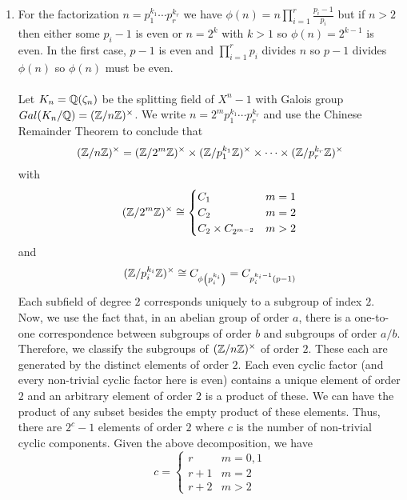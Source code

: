 \documentclass[12pt]{extarticle}
\begin{document}
\begin{enumerate}
\begin{enumerate}
\item For the factorization $n = p_1^{k_1} \cdots p_r^{k_r}$ we have $\phi(n) = n \prod\limits_{i = 1}^{r} \frac{p_i - 1}{p_i}$ but if $n > 2$ then either some $p_i-1$ is even or $n = 2^k$ with $k > 1$ so $\phi(n) = 2^{k - 1}$ is even. In the first case, $p - 1$ is even and $\prod\limits_{i = 1}^r p_i$ divides $n$ so $p-1$ divides $\phi(n)$ so $\phi(n)$ must be even. \\ \\

Let $K_n = \mathbb{Q}(\zeta_n)$ be the splitting field of $X^n - 1$ with Galois group $Gal \small(K_n / \mathbb{Q} \small) = (\mathbb{Z}/n\mathbb{Z})^\times$. We write $n = 2^m p_1^{k_1} \cdots p_r^{k_r}$ and use the Chinese Remainder Theorem to conclude that \[ (\mathbb{Z}/n\mathbb{Z})^\times = (\mathbb{Z}/ 2^m \mathbb{Z})^\times \times (\mathbb{Z}/ p_1^{k_1} \mathbb{Z})^\times \times \cdots \times (\mathbb{Z}/ p_r^{k_r} \mathbb{Z})^\times\]
with \[ (\mathbb{Z}/ 2^m \mathbb{Z})^\times \cong 
\begin{cases}
C_1 & m = 1 \\
C_2 & m = 2 \\
C_2 \times C_{2^{m-2}} & m > 2
\end{cases} \] 
and \[(\mathbb{Z}/ p_i^{k_i} \mathbb{Z})^\times \cong C_{\phi \left(p_i^{k_i} \right)} = C_{p_i^{k_i - 1} ( p -1)}\]
Each subfield of degree $2$ corresponds uniquely to a subgroup of index $2$. Now, we use the fact that, in an abelian group of order $a$, there is a one-to-one correspondence between subgroups of order $b$ and subgroups of order $a/b$. Therefore, we classify the subgroups of $(\mathbb{Z}/ n \mathbb{Z})^\times$ of order $2$. These each are generated by the distinct elements of order $2$. Each even cyclic factor (and every non-trivial cyclic factor here is even) contains a unique element of order $2$ and an arbitrary element of order $2$ is a product of these. We can have the product of any subset besides the empty product of these elements. Thus, there are $2^{c} - 1$ elements of order $2$ where $c$ is the number of non-trivial cyclic components. Given the above decomposition, we have 
\[c = \begin{cases}
r & m = 0, 1 \\
r + 1 & m = 2 \\
r + 2 & m > 2   
\end{cases}\]   


\end{enumerate}
\end{enumerate}
\end{document}

